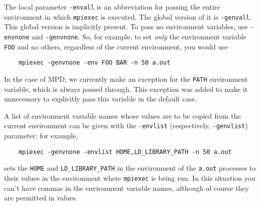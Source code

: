\documentclass[dvipdfm,11pt]{article}
\begin{document}
The local parameter \texttt{-envall} is an abbreviation for passing the
entire environment in which \texttt{mpiexec} is executed.  The global
version of it is \texttt{-genvall}.  This global version is implicitly
present.  To pass no environment variables, use \texttt{-envnone} and
\texttt{-genvnone}.  So, for example, to set \emph{only} the environment
variable \texttt{FOO} and no others, regardless of the current
environment, you would use 
\begin{verbatim}
    mpiexec -genvnone -env FOO BAR -n 50 a.out
\end{verbatim}
In the case of MPD, we currently make an exception for the \texttt{PATH}
environment variable, which is always passed through.  This exception
was added to make it unnecessary to explicitly pass this variable in the
default case.

A list of environment variable names whose values are
to be copied from the current environment can be given with the
\texttt{-envlist} (respectively, \texttt{-genvlist}) parameter; for example,
\begin{verbatim}
    mpiexec -genvnone -envlist HOME,LD_LIBRARY_PATH -n 50 a.out
\end{verbatim}
sets the \texttt{HOME} and \texttt{LD\_LIBRARY\_PATH} in the environment
of the \texttt{a.out} processes to their values in the environment where
\texttt{mpiexec} is being run.  In this situation you can't have commas
in the environment variable names, although of course they are permitted
in values.
\end{document}
